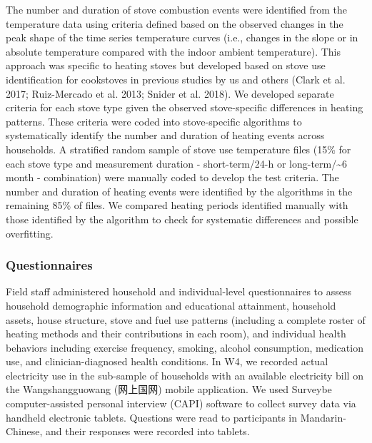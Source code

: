 \documentclass[
  letterpaper,
  DIV=11,
  numbers=noendperiod]{scrartcl}
\begin{document}
The number and duration of stove combustion events were identified from
the temperature data using criteria defined based on the observed
changes in the peak shape of the time series temperature curves (i.e.,
changes in the slope or in absolute temperature compared with the indoor
ambient temperature). This approach was specific to heating stoves but
developed based on stove use identification for cookstoves in previous
studies by us and others (Clark et al. 2017; Ruiz-Mercado et al. 2013;
Snider et al. 2018). We developed separate criteria for each stove type
given the observed stove-specific differences in heating patterns. These
criteria were coded into stove-specific algorithms to systematically
identify the number and duration of heating events across households. A
stratified random sample of stove use temperature files (15\% for each
stove type and measurement duration - short-term/24-h or
long-term/\textasciitilde6 month - combination) were manually coded to
develop the test criteria. The number and duration of heating events
were identified by the algorithms in the remaining 85\% of files. We
compared heating periods identified manually with those identified by
the algorithm to check for systematic differences and possible
overfitting.

\subsubsection{Questionnaires}\label{questionnaires}

Field staff administered household and individual-level questionnaires
to assess household demographic information and educational attainment,
household assets, house structure, stove and fuel use patterns
(including a complete roster of heating methods and their contributions
in each room), and individual health behaviors including exercise
frequency, smoking, alcohol consumption, medication use, and
clinician-diagnosed health conditions. In W4, we recorded actual
electricity use in the sub-sample of households with an available
electricity bill on the Wangshangguowang (网上国网) mobile application.
We used Surveybe computer-assisted personal interview (CAPI) software to
collect survey data via handheld electronic tablets. Questions were read
to participants in Mandarin-Chinese, and their responses were recorded
into tablets.
\end{document}
